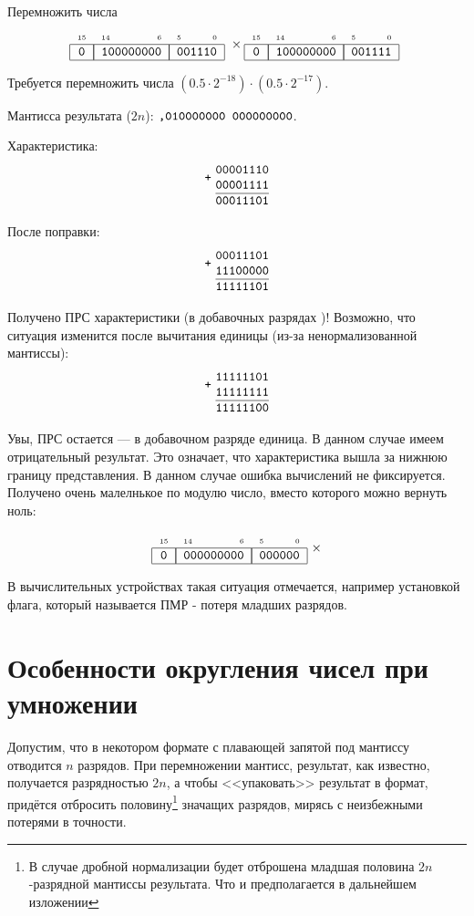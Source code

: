 \begin{Example} 
    Перемножить числа
    \[
        \FloatMyCharHex{0}{100000000}{001110} \times
        \FloatMyCharHex{0}{100000000}{001111}
    \]
\end{Example}
\begin{Solve}
    Требуется перемножить числа $(0.5\cdot 2^{-18})\cdot(0.5\cdot 2^{-17})$.
    
    Мантисса результата ($2n$): $\texttt{,010000000 000000000}$.
    
    Характеристика:
    \[
        \Addition{00001110}
                 {00001111}
                 {00011101}
    \]
    
    После поправки:
    \[
        \Addition{00011101}
                 {11100000}
                 {11111101}
    \]
    
    Получено ПРС характеристики (в добавочных разрядах )! Возможно, что ситуация изменится после вычитания единицы (из-за ненормализованной мантиссы):
    \[
        \Addition{11111101}
                 {11111111}
                 {11111100}
    \]
    
    Увы, ПРС остается --- в добавочном разряде единица. В данном случае имеем отрицательный результат. Это означает, что характеристика вышла за нижнюю границу представления. В данном случае ошибка вычислений не фиксируется. Получено очень малелнькое по модулю число, вместо которого можно вернуть ноль:
    
    \[
        \FloatMyCharHex{0}{000000000}{000000} \times
    \]
    
    В вычислительных устройствах такая ситуация отмечается, например установкой флага, который называется ПМР - потеря младших разрядов.
\end{Solve}


\section{Особенности округления чисел при умножении}
\label{ch::float::ss::round}

Допустим, что в некотором формате с плавающей запятой под мантиссу отводится $n$ разрядов. При перемножении мантисс, результат, как известно, получается разрядностью $2n$, а чтобы <<упаковать>> результат в формат, придётся отбросить половину\footnote{В случае дробной нормализации будет отброшена младшая половина $2n$-разрядной мантиссы результата. Что и предполагается в дальнейшем изложении} значащих разрядов, мирясь с неизбежными потерями в точности.

